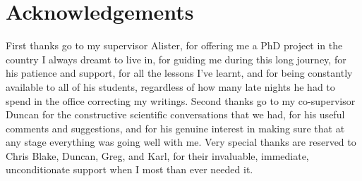 \chapter*{Acknowledgements}

First thanks go to my supervisor Alister, 
for offering me a PhD project in the country I always dreamt to live in, 
for guiding me during this long journey, 
for his patience and support, 
for all the lessons I've learnt, 
and for being constantly available to all of his students, 
regardless of how many late nights he had to spend in the office correcting my writings. 
Second thanks go to my co-supervisor Duncan for the constructive scientific conversations that we had, 
for his useful comments and suggestions, 
and for his genuine interest in making sure that at any stage everything was going well with me. 
Very special thanks are reserved to Chris Blake, Duncan, Greg, and Karl, 
for their invaluable, immediate, unconditionate support when I most than ever needed it. 

%
%
%
